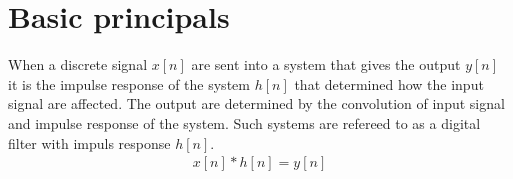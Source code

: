 \section{Basic principals}
When a discrete signal $x[n]$ are sent into a system that gives the output $y[n]$ it is the impulse response of the system $h[n]$ that determined how the input signal are affected. The output are determined by the convolution of input signal and impulse response of the system. Such systems are refereed to as a digital filter with impuls response $h[n]$. 
\begin{align}
x[n]*h[n]=y[n]
\end{align}    

